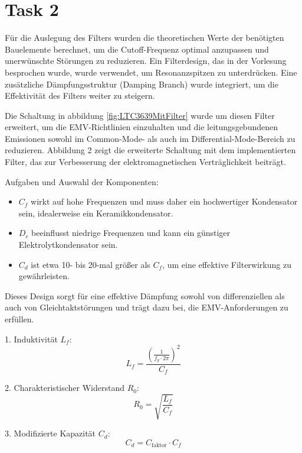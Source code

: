 \section{Task 2} \label{sec:Task2}

Für die Auslegung des Filters wurden die theoretischen Werte der benötigten Bauelemente berechnet, um die Cutoff-Frequenz optimal anzupassen und unerwünschte Störungen zu reduzieren. Ein Filterdesign, das in der Vorlesung besprochen wurde, wurde verwendet, um Resonanzspitzen zu unterdrücken. Eine zusätzliche Dämpfungsstruktur (Damping Branch) wurde integriert, um die Effektivität des Filters weiter zu steigern.

Die Schaltung in abbildung \ref{fig:LTC3639MitFilter} wurde um diesen Filter erweitert, um die EMV-Richtlinien einzuhalten und die leitungsgebundenen Emissionen sowohl im Common-Mode- als auch im Differential-Mode-Bereich zu reduzieren. Abbildung 2 zeigt die erweiterte Schaltung mit dem implementierten Filter, das zur Verbesserung der elektromagnetischen Verträglichkeit beiträgt.

Aufgaben und Auswahl der Komponenten:

\begin{itemize}
    \item \( C_f \) wirkt auf hohe Frequenzen und muss daher ein hochwertiger Kondensator sein, idealerweise ein Keramikkondensator.
    \item \( D_c \) beeinflusst niedrige Frequenzen und kann ein günstiger Elektrolytkondensator sein.
    \item \( C_d \) ist etwa 10- bis 20-mal größer als \( C_f \), um eine effektive Filterwirkung zu gewährleisten.
\end{itemize}

Dieses Design sorgt für eine effektive Dämpfung sowohl von differenziellen als auch von Gleichtaktstörungen und trägt dazu bei, die EMV-Anforderungen zu erfüllen. 

1. Induktivität \(L_f\):
\begin{equation}
    L_f = \frac{\left(\frac{1}{f_g \cdot 2 \pi}\right)^2}{C_f}
    \label{eqn:EffektiveKonvergenzordnung}
\end{equation} 

2. Charakteristischer Widerstand \(R_0\):
\begin{equation}
    R_0 = \sqrt{\frac{L_f}{C_f}}
    \label{eqn:EffektiveKonvergenzordnung}
\end{equation} 

3. Modifizierte Kapazität \(C_d\):
\begin{equation}
    C_d = C_{\text{faktor}} \cdot C_f
    \label{eqn:EffektiveKonvergenzordnung}
\end{equation} 

